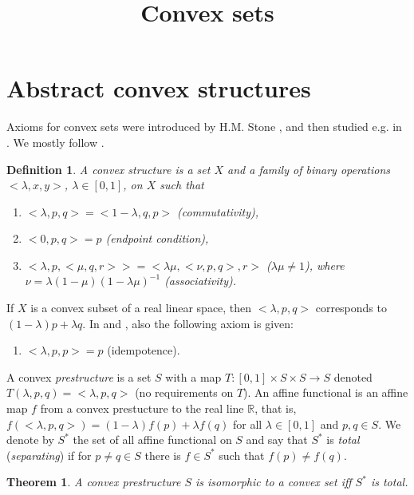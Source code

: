 \documentclass[12pt,letterpaper]{article}
\newtheorem{theorem}[lemma]{Theorem}
\newtheorem{definition}[lemma]{Definition}
\begin{document}
\title{Convex sets }
\maketitle


\section{Abstract convex structures }

Axioms for convex sets were introduced by H.M. Stone \cite{S}, and  then studied e.g. in \cite{G,CF}. We mostly follow \cite{G}.

\begin{definition}\label{de:conv} A convex structure is a set $X$ and a family of binary operations $<\lambda,x,y>$, $\lambda\in [0,1]$, on $X$ such that
\begin{enumerate}
\item[(c1)] $<\lambda, p,q> =<1-\lambda,q,p>$ (commutativity),
\item[(c2)] $<0,p,q>=p$ (endpoint condition),
\item[(c3)]  $<\lambda,p,<\mu,q,r>>=<\lambda\mu,<\nu,p,q>,r>$ ($\lambda\mu\neq 1$), where $\nu=\lambda(1-\mu)(1-\lambda\mu)^{-1}$ (associativity).
\end{enumerate}
\end{definition}

If $X$ is a convex subset of a real linear space, then $<\lambda,p,q>$ corresponds to $(1-\lambda)p+\lambda q$.
In \cite{S} and \cite{CF}, also the following axiom is given:

\begin{enumerate}
\item[(c4)] $<\lambda,p,p>=p$ (idempotence).
\end{enumerate}

A convex \emph{prestructure} is a set $S$ with a map $T:[0,1]\times S\times S \to S$ denoted $T(\lambda,p,q)=<\lambda,p,q>$ (no requirements on $T$).
An \rm{affine functional} is an affine map $f$ from a convex prestucture to the real line $\mathbb R$, that is, $f(<\lambda,p,q>)=(1-\lambda)f(p)+\lambda f(q)$ for all $\lambda \in [0,1]$ and $p,q\in S$. We denote by $S^*$ the set of all affine functional on $S$ and say that $S^*$ is \emph{total} (\emph{separating}) if for $p\neq q\in S$ there is $f\in S^*$ such that $f(p)\neq f(q)$.

\begin{theorem}\label{thm:totla} A convex prestructure $S$ is isomorphic to a convex set iff $S^*$ is total.
\end{theorem}
\end{document}
